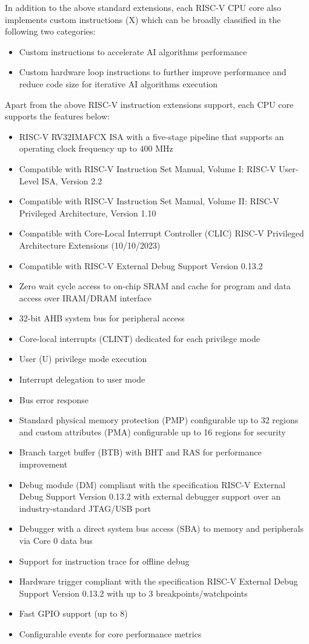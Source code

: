 \documentclass[main\_\_EN.tex]{subfiles}
\begin{document}
In addition to the above standard extensions, each RISC-V CPU core also implements custom instructions (X) which can be broadly classified in the following two categories:
\begin{itemize}
    \item Custom instructions to accelerate AI algorithms performance
    \item Custom hardware loop instructions to further improve performance and reduce code size for iterative AI algorithms execution
\end{itemize}

Apart from the above RISC-V instruction extensions support, each CPU core supports the features below:
\begin{itemize}
    \item RISC-V RV32IMAFCX ISA with a five-stage pipeline that supports an operating clock frequency up to 400 MHz
    \item Compatible with RISC-V Instruction Set Manual, Volume I: RISC-V User-Level ISA, Version 2.2
    \item Compatible with RISC-V Instruction Set Manual, Volume II: RISC-V Privileged Architecture, Version 1.10
    \item Compatible with Core-Local Interrupt Controller (CLIC) RISC-V Privileged Architecture Extensions (10/10/2023)
    \item Compatible with RISC-V External Debug Support Version 0.13.2
    \item Zero wait cycle access to on-chip SRAM and cache for program and data access over IRAM/DRAM interface
    \item 32-bit AHB system bus for peripheral access
    \item Core-local interrupts (CLINT) dedicated for each privilege mode
    \item User (U) privilege mode execution
    \item Interrupt delegation to user mode
    \item Bus error response
    \item Standard physical memory protection (PMP) configurable up to 32 regions and custom attributes (PMA) configurable up to 16 regions for security
    \item Branch target buffer (BTB) with BHT and RAS for performance improvement
    \item Debug module (DM) compliant with the specification RISC-V External Debug Support Version 0.13.2 with external debugger support over an industry-standard JTAG/USB port
    \item Debugger with a direct system bus access (SBA) to memory and peripherals via Core 0 data bus
    \item Support for instruction trace for offline debug
    \item Hardware trigger compliant with the specification RISC-V External Debug Support Version 0.13.2 with up to 3 breakpoints/watchpoints
    \item Fast GPIO support (up to 8)
    \item Configurable events for core performance metrics
\end{itemize}
\end{document}
